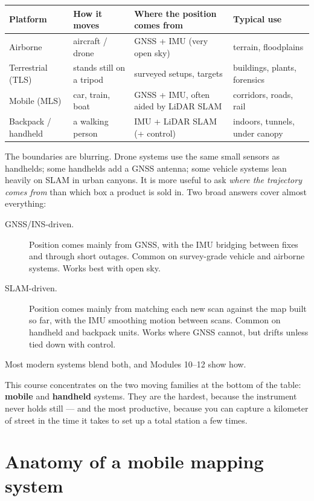 
\begin{center}\small
\renewcommand{\arraystretch}{1.2}
\begin{tabularx}{\linewidth}{lXXl}
\toprule
\textbf{Platform} & \textbf{How it moves} & \textbf{Where the position comes from} & \textbf{Typical use}\\ \midrule
Airborne & aircraft / drone & GNSS + IMU (very open sky) & terrain, floodplains \\
Terrestrial (TLS) & stands still on a tripod & surveyed setups, targets & buildings, plants, forensics\\
Mobile (MLS) & car, train, boat & GNSS + IMU, often aided by LiDAR SLAM & corridors, roads, rail\\
Backpack / handheld & a walking person & IMU + LiDAR SLAM (+ control) & indoors, tunnels, under canopy\\
\bottomrule
\end{tabularx}
\end{center}

The boundaries are blurring. Drone systems use the same small sensors as handhelds; some handhelds add a GNSS antenna; some vehicle systems lean heavily on SLAM in urban canyons. It is more useful to ask \emph{where the trajectory comes from} than which box a product is sold in. Two broad answers cover almost everything:
\begin{description}
\item[GNSS/INS-driven.] Position comes mainly from GNSS, with the IMU bridging between fixes and through short outages. Common on survey-grade vehicle and airborne systems. Works best with open sky.
\item[SLAM-driven.] Position comes mainly from matching each new scan against the map built so far, with the IMU smoothing motion between scans. Common on handheld and backpack units. Works where GNSS cannot, but drifts unless tied down with control.
\end{description}
Most modern systems blend both, and Modules 10--12 show how.

This course concentrates on the two moving families at the bottom of the table: \textbf{mobile} and \textbf{handheld} systems. They are the hardest, because the instrument never holds still --- and the most productive, because you can capture a kilometer of street in the time it takes to set up a total station a few times.

\section{Anatomy of a mobile mapping system}


